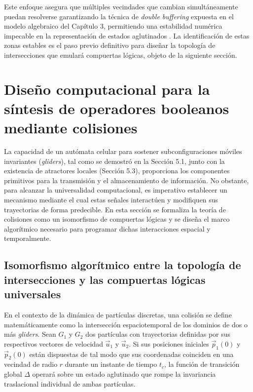Este enfoque asegura que múltiples vecindades que cambian simultáneamente puedan resolverse garantizando la técnica de \textit{double buffering} expuesta en el modelo algebraico del Capítulo 3, permitiendo una estabilidad numérica impecable en la representación de estados aglutinados \cite{Basurto2009}. La identificación de estas zonas estables es el paso previo definitivo para diseñar la topología de intersecciones que emulará compuertas lógicas, objeto de la siguiente sección.



\section{Diseño computacional para la síntesis de operadores booleanos mediante colisiones}
\label{sec:sintesis_operadores}

La capacidad de un autómata celular para sostener subconfiguraciones móviles invariantes (\textit{gliders}), tal como se demostró en la Sección 5.1, junto con la existencia de atractores locales (Sección 5.3), proporciona los componentes primitivos para la transmisión y el almacenamiento de información. No obstante, para alcanzar la universalidad computacional, es imperativo establecer un mecanismo mediante el cual estas señales interactúen y modifiquen sus trayectorias de forma predecible. En esta sección se formaliza la teoría de colisiones como un isomorfismo de compuertas lógicas y se diseña el marco algorítmico necesario para programar dichas interacciones espacial y temporalmente.

\subsection{Isomorfismo algorítmico entre la topología de intersecciones y las compuertas lógicas universales}
\label{subsec:isomorfismo_logico}

En el contexto de la dinámica de partículas discretas, una colisión se define matemáticamente como la intersección espaciotemporal de los dominios de dos o más \textit{gliders}. Sean $G_1$ y $G_2$ dos partículas con trayectorias definidas por sus respectivos vectores de velocidad $\vec{u}_1$ y $\vec{u}_2$. Si sus posiciones iniciales $\vec{p}_1(0)$ y $\vec{p}_2(0)$ están dispuestas de tal modo que sus coordenadas coinciden en una vecindad de radio $r$ durante un instante de tiempo $t_c$, la función de transición global $\Delta$ operará sobre un estado aglutinado que rompe la invariancia traslacional individual de ambas partículas.

